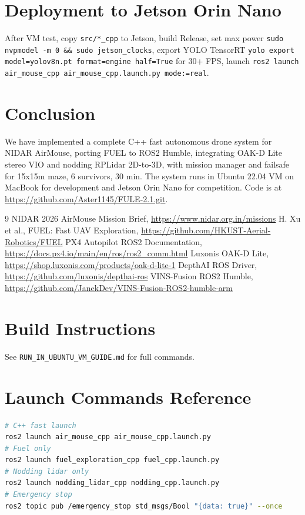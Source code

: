 \documentclass[12pt,a4paper]{article}
\begin{document}
\section{Deployment to Jetson Orin Nano}

After VM test, copy \texttt{src/*\_cpp} to Jetson, build Release, set max power \texttt{sudo nvpmodel -m 0 \&\& sudo jetson\_clocks}, export YOLO TensorRT \texttt{yolo export model=yolov8n.pt format=engine half=True} for 30+ FPS, launch \texttt{ros2 launch air\_mouse\_cpp air\_mouse\_cpp.launch.py mode:=real}.

\section{Conclusion}

We have implemented a complete C++ fast autonomous drone system for NIDAR AirMouse, porting FUEL to ROS2 Humble, integrating OAK-D Lite stereo VIO and nodding RPLidar 2D-to-3D, with mission manager and failsafe for 15x15m maze, 6 survivors, 30 min. The system runs in Ubuntu 22.04 VM on MacBook for development and Jetson Orin Nano for competition. Code is at \url{https://github.com/Aster1145/FULE-2.1.git}.

\begin{thebibliography}{9}
 NIDAR 2026 AirMouse Mission Brief, \url{https://www.nidar.org.in/missions}
 H. Xu et al., FUEL: Fast UAV Exploration, \url{https://github.com/HKUST-Aerial-Robotics/FUEL}
 PX4 Autopilot ROS2 Documentation, \url{https://docs.px4.io/main/en/ros/ros2_comm.html}
 Luxonis OAK-D Lite, \url{https://shop.luxonis.com/products/oak-d-lite-1}
 DepthAI ROS Driver, \url{https://github.com/luxonis/depthai-ros}
 VINS-Fusion ROS2 Humble, \url{https://github.com/JanekDev/VINS-Fusion-ROS2-humble-arm}
\end{thebibliography}

\appendix
\section{Build Instructions}

See \texttt{RUN\_IN\_UBUNTU\_VM\_GUIDE.md} for full commands.

\section{Launch Commands Reference}

\begin{lstlisting}[language=bash]
# C++ fast launch
ros2 launch air_mouse_cpp air_mouse_cpp.launch.py
# Fuel only
ros2 launch fuel_exploration_cpp fuel_cpp.launch.py
# Nodding lidar only
ros2 launch nodding_lidar_cpp nodding_cpp.launch.py
# Emergency stop
ros2 topic pub /emergency_stop std_msgs/Bool "{data: true}" --once
\end{lstlisting}
\end{document}

